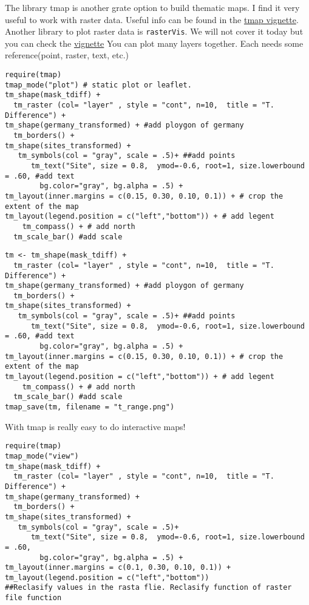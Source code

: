\documentclass[
]{book}
\theoremstyle{definition}
\theoremstyle{definition}
\theoremstyle{definition}
\theoremstyle{definition}
\theoremstyle{remark}
\begin{document}
The library tmap is another grate option to build thematic maps. I find it very useful to work with raster data. Useful info can be found in the \href{https://cran.r-project.org/web/packages/tmap/vignettes/tmap-getstarted.html}{tmap vignette}. Another library to plot raster data is \texttt{rasterVis}. We will not cover it today but you can check the \href{https://oscarperpinan.github.io/rastervis/}{vignette}
You can plot many layers together. Each needs some reference(point, raster, text, etc.)

\begin{verbatim}
require(tmap)
tmap_mode("plot") # static plot or leaflet. 
tm_shape(mask_tdiff) + 
  tm_raster (col= "layer" , style = "cont", n=10,  title = "T. Difference") +
tm_shape(germany_transformed) + #add ploygon of germany
  tm_borders() +
tm_shape(sites_transformed) +
   tm_symbols(col = "gray", scale = .5)+ ##add points
      tm_text("Site", size = 0.8,  ymod=-0.6, root=1, size.lowerbound = .60, #add text
        bg.color="gray", bg.alpha = .5) +
tm_layout(inner.margins = c(0.15, 0.30, 0.10, 0.1)) + # crop the extent of the map
tm_layout(legend.position = c("left","bottom")) + # add legent
    tm_compass() + # add north
  tm_scale_bar() #add scale
\end{verbatim}

\begin{verbatim}
tm <- tm_shape(mask_tdiff) + 
  tm_raster (col= "layer" , style = "cont", n=10,  title = "T. Difference") +
tm_shape(germany_transformed) + #add ploygon of germany
  tm_borders() +
tm_shape(sites_transformed) +
   tm_symbols(col = "gray", scale = .5)+ ##add points
      tm_text("Site", size = 0.8,  ymod=-0.6, root=1, size.lowerbound = .60, #add text
        bg.color="gray", bg.alpha = .5) +
tm_layout(inner.margins = c(0.15, 0.30, 0.10, 0.1)) + # crop the extent of the map
tm_layout(legend.position = c("left","bottom")) + # add legent
    tm_compass() + # add north
  tm_scale_bar() #add scale
tmap_save(tm, filename = "t_range.png")
\end{verbatim}

With tmap is really easy to do interactive maps!

\begin{verbatim}
require(tmap)
tmap_mode("view")
tm_shape(mask_tdiff) +
  tm_raster (col= "layer" , style = "cont", n=10,  title = "T. Difference") +
tm_shape(germany_transformed) +
  tm_borders() +
tm_shape(sites_transformed) +
   tm_symbols(col = "gray", scale = .5)+
      tm_text("Site", size = 0.8,  ymod=-0.6, root=1, size.lowerbound = .60, 
        bg.color="gray", bg.alpha = .5) +
tm_layout(inner.margins = c(0.1, 0.30, 0.10, 0.1)) +
tm_layout(legend.position = c("left","bottom"))
##Reclasify values in the rasta flie. Reclasify function of raster file function
\end{verbatim}
\end{document}
